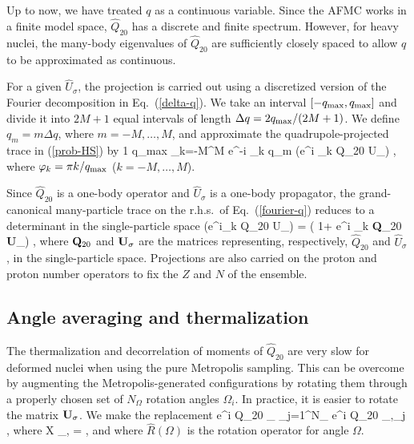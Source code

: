 \documentclass[prc,twocolumn,aps,showpacs,floatfix,nofootinbib,letterpaper,preprintnumbers]{revtex4-1}
\begin{document}
Up to now, we have treated $q$ as a continuous variable. Since the AFMC works in a finite model space, $\hat Q_{20}$ has a discrete and finite spectrum. However, for heavy nuclei, the many-body eigenvalues of $\hat Q_{20}$ are sufficiently closely spaced to allow $q$ to be approximated as continuous.

For a given $\hat U_\sigma$, the projection is carried out using
a discretized version of the Fourier decomposition in Eq.~(\ref{delta-q}). We
take an interval $[-q_{\rm max},q_{\rm max}]$ and divide it into $2M+1$ 
equal intervals of length $\Delta q=2q_{\rm
max}/(2M+1)$. We define $q_m=m \Delta q$, where
$m=-M,\ldots,M$, and approximate the quadrupole-projected trace in
(\ref{prob-HS}) by
\be\label{fourier-q}
\Tr{} \!\!  \approx \!\! {1 q_{\rm max}}\! \! \sum_{k=-M}^M
  \!\!\!  e^{-i \varphi_k q_m} \Tr(e^{i \varphi_k \hat Q_{20}} \hat U_\sigma) \;,
\ee
where $\varphi_k = \pi k/q_{\rm max}$ ($k=-M,\ldots, M$). 

Since $\hat Q_{20}$ is a one-body operator and $\hat U_\sigma$ is a one-body propagator,
the grand-canonical many-particle trace on the r.h.s.~of Eq.~(\ref{fourier-q})
reduces to a determinant in the single-particle space 
\be
 \Tr\left(e^{i\varphi_k \hat Q_{20}} \hat U_\sigma \right) = 
  \det  \left( 1+   e^{i \varphi_k {\bf Q}_{20}} {\bf U}_\sigma\right) \;,
  \ee
where ${\bf Q}_{20}$ and ${\bf U}_\sigma$ are  the matrices representing, respectively, $\hat Q_{20}$ and $\hat U_\sigma$, in the single-particle space.  Projections are also carried on the  proton and proton number operators to fix the $Z$ and $N$ of the ensemble. 

\subsection{Angle averaging and thermalization}

The thermalization and decorrelation of moments of $\hat Q_{20}$ are very slow for deformed nuclei when using the pure Metropolis sampling.  This can be overcome by augmenting the Metropolis-generated configurations by rotating them through a properly chosen set of $N_{\Omega}$ rotation angles  $\Omega_i$.  In practice, it is easier to rotate the matrix ${\bf U}_\sigma$.  We make the replacement
\be 
\langle e^{i \varphi \hat Q_{20}} \rangle_\sigma {} \sum_{j=1}^{N_\Omega} \langle e^{i \varphi \hat Q_{20}} \rangle_{\sigma,\Omega_j} \;,
\ee
where
\be
\langle \hat X \rangle_{\sigma,\Omega} = \;,
\ee
and where $\hat R(\Omega)$ is the rotation operator for angle $\Omega$.
\end{document}
